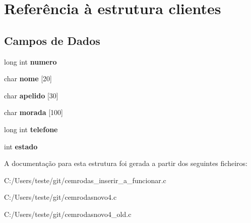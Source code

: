 \hypertarget{structclientes}{\section{Referência à estrutura clientes}
\label{structclientes}
}
\subsection*{Campos de Dados}
\begin{DoxyCompactItemize}
\item 
\hypertarget{structclientes_a6861d035c44fb0bef558ae07c347f493}{long int {\bfseries numero}}\label{structclientes_a6861d035c44fb0bef558ae07c347f493}

\item 
\hypertarget{structclientes_a31ca3f05d944e272b57a61f356dd8f1d}{char {\bfseries nome} \mbox{[}20\mbox{]}}\label{structclientes_a31ca3f05d944e272b57a61f356dd8f1d}

\item 
\hypertarget{structclientes_a8b0d7cba87290f2f7b1fd87b6698e426}{char {\bfseries apelido} \mbox{[}30\mbox{]}}\label{structclientes_a8b0d7cba87290f2f7b1fd87b6698e426}

\item 
\hypertarget{structclientes_a1e4b5d6ebdbee2c3964c82b62c74dc83}{char {\bfseries morada} \mbox{[}100\mbox{]}}\label{structclientes_a1e4b5d6ebdbee2c3964c82b62c74dc83}

\item 
\hypertarget{structclientes_af1e9334befe5a6cbee279f37fbb7c0fd}{long int {\bfseries telefone}}\label{structclientes_af1e9334befe5a6cbee279f37fbb7c0fd}

\item 
\hypertarget{structclientes_a876d08c1d21086e4fd228744da10d028}{int {\bfseries estado}}\label{structclientes_a876d08c1d21086e4fd228744da10d028}

\end{DoxyCompactItemize}


A documentação para esta estrutura foi gerada a partir dos seguintes ficheiros\-:\begin{DoxyCompactItemize}
\item 
C\-:/\-Users/teste/git/cemrodas\-\_\-inserir\-\_\-a\-\_\-funcionar.\-c\item 
C\-:/\-Users/teste/git/cemrodasnovo4.\-c\item 
C\-:/\-Users/teste/git/cemrodasnovo4\-\_\-old.\-c\end{DoxyCompactItemize}
